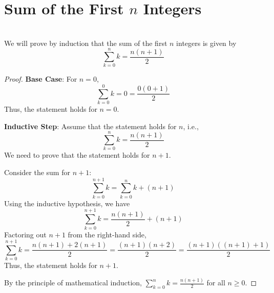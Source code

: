 \documentclass[]{article}
\begin{document}
	\section*{Sum of the First $n$ Integers}
	\noindent\\
	We will prove by induction that the sum of the first $n$ integers is given by
	$$ \sum_{k=0}^n k = \frac{n(n+1)}{2} $$
	\begin{proof}
		\textbf{Base Case}:
		For $n = 0$,
		$$ \sum_{k=0}^0 k = 0 = \frac{0(0+1)}{2} $$
		Thus, the statement holds for $n = 0$.
		
		\textbf{Inductive Step}:
		Assume that the statement holds for $n$, i.e.,
		$$ \sum_{k=0}^n k = \frac{n(n+1)}{2} $$
		We need to prove that the statement holds for $n + 1$.
		
		Consider the sum for $n + 1$:
		$$ \sum_{k=0}^{n+1} k = \sum_{k=0}^n k + (n+1) $$
		Using the inductive hypothesis, we have
		$$ \sum_{k=0}^{n+1} k = \frac{n(n+1)}{2} + (n+1) $$
		Factoring out $n+1$ from the right-hand side,
		$$ \sum_{k=0}^{n+1} k = \frac{n(n+1) + 2(n+1)}{2} = \frac{(n+1)(n+2)}{2} = \frac{(n+1)((n+1)+1)}{2} $$
		Thus, the statement holds for $n + 1$.
		
		By the principle of mathematical induction, $\sum_{k=0}^n k = \frac{n(n+1)}{2}$ for all $n \geq 0$.
	\end{proof}
	
\end{document}

